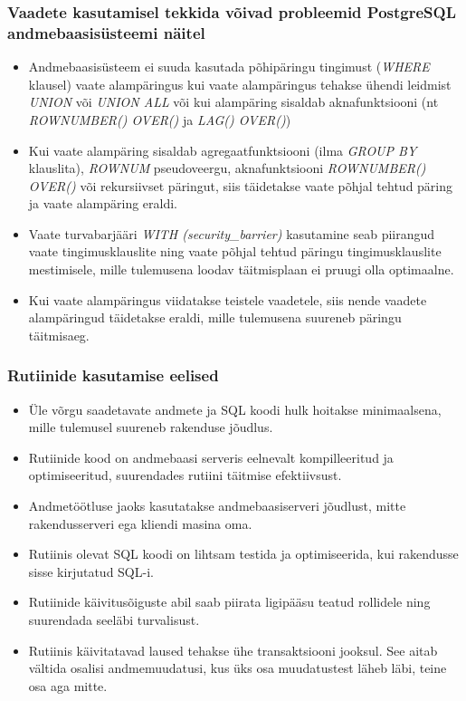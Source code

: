\documentclass[a4paper,12pt]{article} %
\begin{document}
\subsubsection{Vaadete kasutamisel tekkida võivad probleemid PostgreSQL andmebaasisüsteemi näitel}
\begin{itemize}
\item Andmebaasisüsteem ei suuda kasutada põhipäringu tingimust (\textit{WHERE} klausel) vaate alampäringus kui vaate alampäringus tehakse ühendi leidmist \textit{UNION} või \textit{UNION ALL} või kui alampäring sisaldab aknafunktsiooni (nt \textit{ROWNUMBER() OVER()} ja \textit{LAG() OVER()})
\item Kui vaate alampäring sisaldab agregaatfunktsiooni (ilma \textit{GROUP BY} klauslita), \textit{ROWNUM} pseudoveergu, aknafunktsiooni \textit{ROWNUMBER() OVER()} või rekursiivset päringut, siis täidetakse vaate põhjal tehtud päring ja vaate alampäring eraldi.
\item Vaate turvabarjääri \textit{WITH (security\_barrier)} kasutamine seab piirangud vaate tingimusklauslite ning vaate põhjal tehtud päringu tingimusklauslite mestimisele, mille tulemusena loodav täitmisplaan ei pruugi olla optimaalne.
\item Kui vaate alampäringus viidatakse teistele vaadetele, siis nende vaadete alampäringud täidetakse eraldi, mille tulemusena suureneb päringu täitmisaeg.
\end{itemize}
\cite[lk 101-102]{VaadeteMojuParingutele}

\subsubsection{Rutiinide kasutamise eelised}
\begin{itemize}
\item Üle võrgu saadetavate andmete ja SQL koodi hulk hoitakse minimaalsena, mille tulemusel suureneb rakenduse jõudlus.
\item Rutiinide kood on andmebaasi serveris eelnevalt kompilleeritud ja optimiseeritud, suurendades rutiini täitmise efektiivsust.
\item Andmetöötluse jaoks kasutatakse andmebaasiserveri jõudlust, mitte rakendusserveri ega kliendi masina oma.
\item Rutiinis olevat SQL koodi on lihtsam testida ja optimiseerida, kui rakendusse sisse kirjutatud SQL-i.
\item Rutiinide käivitusõiguste abil saab piirata ligipääsu teatud rollidele ning suurendada seeläbi turvalisust.
\item Rutiinis käivitatavad laused tehakse ühe transaktsiooni jooksul. See aitab vältida osalisi andmemuudatusi, kus üks osa muudatustest läheb läbi, teine osa aga mitte.
\end{itemize}
\cite[lk 179, 195]{BuildingTheAgileDatabase}
\end{document}
